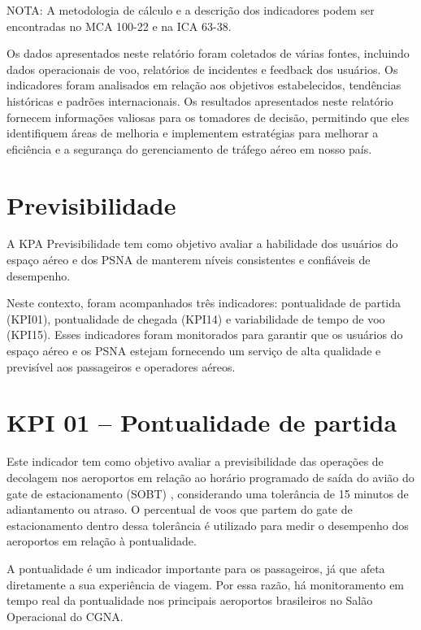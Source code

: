 \documentclass[
]{book}
\begin{document}
NOTA: A metodologia de cálculo e a descrição dos indicadores podem ser encontradas no MCA 100-22 e na ICA 63-38.

Os dados apresentados neste relatório foram coletados de várias fontes, incluindo dados operacionais de voo, relatórios de incidentes e feedback dos usuários. Os indicadores foram analisados em relação aos objetivos estabelecidos, tendências históricas e padrões internacionais. Os resultados apresentados neste relatório fornecem informações valiosas para os tomadores de decisão, permitindo que eles identifiquem áreas de melhoria e implementem estratégias para melhorar a eficiência e a segurança do gerenciamento de tráfego aéreo em nosso país.

\hypertarget{previsibilidade}{%
\section{Previsibilidade}\label{previsibilidade}}

A KPA Previsibilidade tem como objetivo avaliar a habilidade dos usuários do espaço aéreo e dos PSNA de manterem níveis consistentes e confiáveis de desempenho.

Neste contexto, foram acompanhados três indicadores: pontualidade de partida (KPI01), pontualidade de chegada (KPI14) e variabilidade de tempo de voo (KPI15). Esses indicadores foram monitorados para garantir que os usuários do espaço aéreo e os PSNA estejam fornecendo um serviço de alta qualidade e previsível aos passageiros e operadores aéreos.

\hypertarget{kpi-01-pontualidade-de-partida}{%
\section{KPI 01 -- Pontualidade de partida}\label{kpi-01-pontualidade-de-partida}}

Este indicador tem como objetivo avaliar a previsibilidade das operações de decolagem nos aeroportos em relação ao horário programado de saída do avião do gate de estacionamento (SOBT) , considerando uma tolerância de 15 minutos de adiantamento ou atraso. O percentual de voos que partem do gate de estacionamento dentro dessa tolerância é utilizado para medir o desempenho dos aeroportos em relação à pontualidade.

A pontualidade é um indicador importante para os passageiros, já que afeta diretamente a sua experiência de viagem. Por essa razão, há monitoramento em tempo real da pontualidade nos principais aeroportos brasileiros no Salão Operacional do CGNA.
\end{document}

